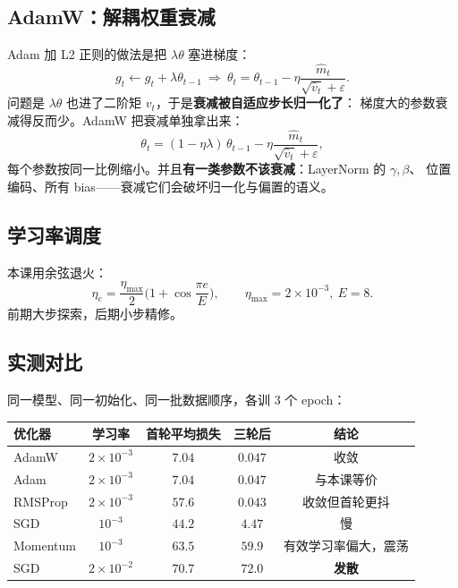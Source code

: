 \documentclass[11pt,a4paper]{ctexart}
\begin{document}
\subsection{AdamW：解耦权重衰减}

Adam 加 L2 正则的做法是把 $\lambda\theta$ 塞进梯度：
\begin{equation}
  g_t\leftarrow g_t+\lambda\theta_{t-1}
  \ \Rightarrow\ \theta_t=\theta_{t-1}-\eta\frac{\hat m_t}{\sqrt{\hat v_t}+\varepsilon}.
\end{equation}
问题是 $\lambda\theta$ 也进了二阶矩 $v_t$，于是\textbf{衰减被自适应步长归一化了}：
梯度大的参数衰减得反而少。AdamW 把衰减单独拿出来：
\begin{equation}
  \theta_t=(1-\eta\lambda)\,\theta_{t-1}-\eta\frac{\hat m_t}{\sqrt{\hat v_t}+\varepsilon},
\end{equation}
每个参数按同一比例缩小。并且\textbf{有一类参数不该衰减}：LayerNorm 的 $\gamma,\beta$、
位置编码、所有 bias——衰减它们会破坏归一化与偏置的语义。

\subsection{学习率调度}

本课用余弦退火：
\begin{equation}
  \eta_e=\frac{\eta_{\max}}{2}\Big(1+\cos\frac{\pi e}{E}\Big),
  \qquad \eta_{\max}=2\times10^{-3},\ E=8 .
\end{equation}
前期大步探索，后期小步精修。

\subsection{实测对比}

同一模型、同一初始化、同一批数据顺序，各训 $3$ 个 epoch：

\begin{center}
\small
\begin{tabular}{@{}lcccc@{}}
\toprule
优化器 & 学习率 & 首轮平均损失 & 三轮后 & 结论 \\
\midrule
AdamW & $2\times10^{-3}$ & $7.04$ & $\mathbf{0.047}$ & 收敛 \\
Adam & $2\times10^{-3}$ & $7.04$ & $0.047$ & 与本课等价 \\
RMSProp & $2\times10^{-3}$ & $57.6$ & $0.043$ & 收敛但首轮更抖 \\
SGD & $10^{-3}$ & $44.2$ & $4.47$ & 慢 \\
Momentum & $10^{-3}$ & $63.5$ & $59.9$ & 有效学习率偏大，震荡 \\
SGD & $2\times10^{-2}$ & $70.7$ & $72.0$ & \textbf{发散} \\
\bottomrule
\end{tabular}
\end{center}
\end{document}
